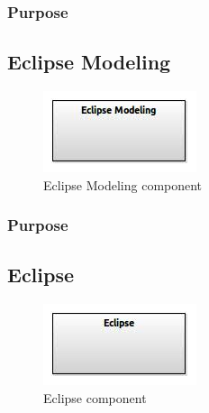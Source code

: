 \documentclass{gemoc} %
\begin{document}
\subsubsection{Purpose}



\subsection{Eclipse Modeling}

\begin{figure}[htp]
	\begin{center}
	\includegraphics*[trim=0.0cm 0.0cm 0cm 0.0cm, clip=true, scale=1.0]{../images/generated/Generated_Eclipse Modeling.jpg}
	\caption{Eclipse Modeling component}
	\end{center}
\end{figure}

\subsubsection{Purpose}



\subsection{Eclipse}

\begin{figure}[htp]
	\begin{center}
	\includegraphics*[trim=0.0cm 0.0cm 0cm 0.0cm, clip=true, scale=1.0]{../images/generated/Generated_Eclipse.jpg}
	\caption{Eclipse component}
	\end{center}
\end{figure}
\end{document}
